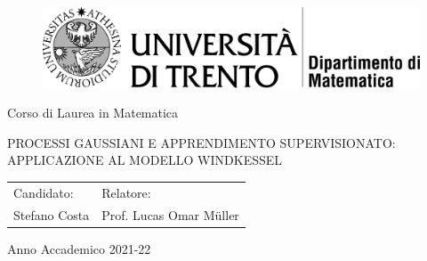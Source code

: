 

\begin{figure}[H]
\centering
\includegraphics{images/dmtesi.png}
\end{figure}

\setlength{\parskip}{-12pt} %
\begin{center}
\vspace{0.5cm}
\Large Corso di Laurea  in Matematica
\end{center}

\vspace{5 cm} %


\begin{center}
{\fontsize{20}{30} \selectfont PROCESSI GAUSSIANI E APPRENDIMENTO SUPERVISIONATO: APPLICAZIONE AL MODELLO WINDKESSEL \par} %
\end{center}


\vspace{6 cm} %


\begin{large}
\begin{tabular}{m{7cm}l}
Candidato: & Relatore:\\
Stefano Costa & Prof. Lucas Omar Müller
\end{tabular}
\end{large}


\vfill %

\setlength{\parskip}{-18pt} %
\begin{center}
{Anno Accademico 2021-22}
\end{center}
\setlength{\parskip}{0pt} %